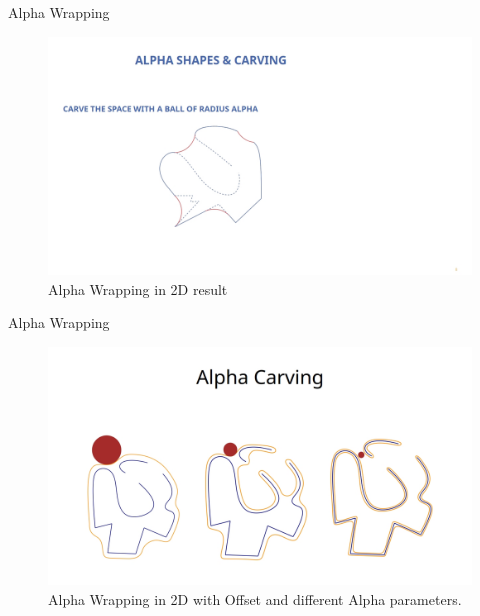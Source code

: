 \documentclass[10pt]{beamer}
\begin{document}
\begin{frame}{Alpha Wrapping}
  \begin{figure}[H]
    \centering
    \includegraphics[width=1.1\textwidth]{images/alpha-wrapping2.jpg}
    \caption{Alpha Wrapping in 2D result}
\end{figure}
\end{frame}

\begin{frame}{Alpha Wrapping}
  \begin{figure}[H]
    \centering
    \includegraphics[width=1.1\textwidth]{images/alpha-wrapping3.jpg}
    \caption{Alpha Wrapping in 2D with Offset and different Alpha parameters.}
\end{figure}
\end{frame}
\end{document}
